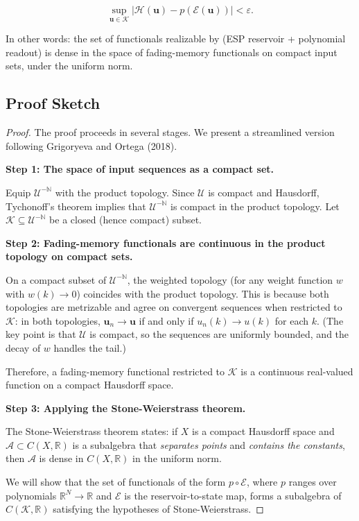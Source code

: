 \[
\sup_{\mathbf{u} \in \mathcal{K}} |\mathcal{H}(\mathbf{u}) - p(\mathcal{E}(\mathbf{u}))| < \varepsilon.
\]

In other words: the set of functionals realizable by (ESP reservoir + polynomial
readout) is dense in the space of fading-memory functionals on compact input sets,
under the uniform norm.

\subsection{Proof Sketch}\label{sec:15.3.2}

\begin{proof}
The proof proceeds in several stages. We present a streamlined version following
Grigoryeva and Ortega (2018).

\textbf{Step 1: The space of input sequences as a compact set.}

Equip $\mathcal{U}^{-\mathbb{N}}$ with the product topology. Since $\mathcal{U}$ is
compact and Hausdorff, Tychonoff's theorem implies that $\mathcal{U}^{-\mathbb{N}}$
is compact in the product topology. Let $\mathcal{K} \subseteq \mathcal{U}^{-\mathbb{N}}$ be a
closed (hence compact) subset.

\textbf{Step 2: Fading-memory functionals are continuous in the product topology on compact sets.}

On a compact subset of $\mathcal{U}^{-\mathbb{N}}$, the weighted topology (for any
weight function $w$ with $w(k) \to 0$) coincides with the product topology. This is
because both topologies are metrizable and agree on convergent sequences when
restricted to $\mathcal{K}$: in both topologies, $\mathbf{u}_n \to \mathbf{u}$ if and
only if $u_n(k) \to u(k)$ for each $k$. (The key point is that $\mathcal{U}$ is compact,
so the sequences are uniformly bounded, and the decay of $w$ handles the tail.)

Therefore, a fading-memory functional restricted to $\mathcal{K}$ is a continuous
real-valued function on a compact Hausdorff space.

\textbf{Step 3: Applying the Stone-Weierstrass theorem.}

The Stone-Weierstrass theorem states: if $X$ is a compact Hausdorff space and
$\mathcal{A} \subset C(X, \mathbb{R})$ is a subalgebra that \textit{separates points} and
\textit{contains the constants}, then $\mathcal{A}$ is dense in $C(X, \mathbb{R})$ in the
uniform norm.

We will show that the set of functionals of the form $p \circ \mathcal{E}$, where $p$
ranges over polynomials $\mathbb{R}^N \to \mathbb{R}$ and $\mathcal{E}$ is the
reservoir-to-state map, forms a subalgebra of $C(\mathcal{K}, \mathbb{R})$ satisfying
the hypotheses of Stone-Weierstrass.


\end{proof}
